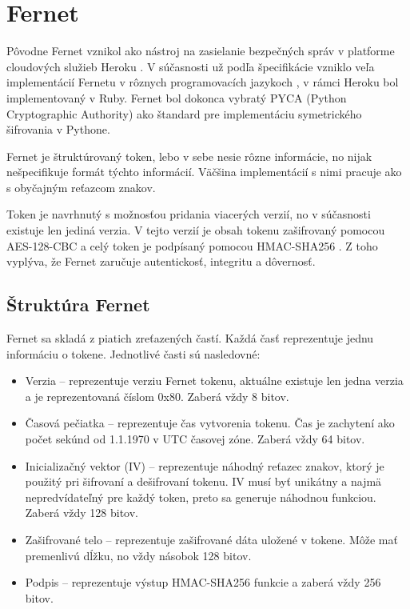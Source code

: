 \section{Fernet}

Pôvodne Fernet vznikol ako nástroj na zasielanie bezpečných správ v platforme cloudových služieb Heroku \cite{fernet_legacy}. V súčasnosti už podľa špecifikácie \cite{fernet_spec} vzniklo veľa implementácií Fernetu v rôznych programovacích jazykoch \cite{fernet_cpp, fernet_haskell}, v rámci Heroku bol implementovaný v Ruby. Fernet bol dokonca vybratý PYCA (Python Cryptographic Authority) \cite{pyca_crypto} ako štandard pre implementáciu symetrického šifrovania v Pythone.

Fernet je štruktúrovaný token, lebo v sebe nesie rôzne informácie, no nijak nešpecifikuje formát týchto informácií. Väčšina implementácií s nimi pracuje ako s obyčajným reťazcom znakov. 

Token je navrhnutý s možnosťou pridania viacerých verzií, no v súčasnosti existuje len jediná verzia. V tejto verzií je obsah tokenu zašifrovaný pomocou AES-128-CBC \cite{aes_cbc} a celý token je podpísaný pomocou HMAC-SHA256 \cite{hmac}. Z toho vyplýva, že Fernet zaručuje autentickosť, integritu a dôvernosť.

\subsection{Štruktúra Fernet}

Fernet sa skladá z piatich zreťazených častí. Každá časť reprezentuje jednu informáciu o tokene. Jednotlivé časti sú nasledovné:

\begin{itemize}
    \item Verzia -- reprezentuje verziu Fernet tokenu, aktuálne existuje len jedna verzia a je reprezentovaná číslom 0x80. Zaberá vždy 8 bitov.
    \item Časová pečiatka -- reprezentuje čas vytvorenia tokenu. Čas je zachytení ako počet sekúnd od 1.1.1970 v UTC časovej zóne. Zaberá vždy 64 bitov.
    \item Inicializačný vektor (IV) -- reprezentuje náhodný reťazec znakov, ktorý je použitý pri šifrovaní a dešifrovaní tokenu. IV musí byť unikátny a najmä nepredvídateľný pre každý token, preto sa generuje náhodnou funkciou. Zaberá vždy 128 bitov.
    \item Zašifrované telo -- reprezentuje zašifrované dáta uložené v tokene. Môže mať premenlivú dĺžku, no vždy násobok 128 bitov.
    \item Podpis -- reprezentuje výstup HMAC-SHA256 funkcie a zaberá vždy 256 bitov.
\end{itemize}

